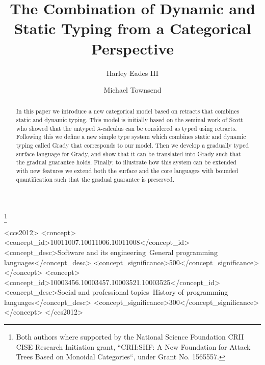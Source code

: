 \documentclass[sigplan]{acmart}\settopmatter{printfolios=true}
\begin{document}
\title{The Combination of Dynamic and Static Typing from a Categorical Perspective}
\author{Harley Eades III}

\author{Michael Townsend}

\thanks{Both authors where supported by the National Science
  Foundation CRII CISE Research Initiation grant, ``CRII:SHF: A New
  Foundation for Attack Trees Based on Monoidal Categories``, under
  Grant No. 1565557.}

\begin{CCSXML}
<ccs2012>
<concept>
<concept_id>10011007.10011006.10011008</concept_id>
<concept_desc>Software and its engineering~General programming languages</concept_desc>
<concept_significance>500</concept_significance>
</concept>
<concept>
<concept_id>10003456.10003457.10003521.10003525</concept_id>
<concept_desc>Social and professional topics~History of programming languages</concept_desc>
<concept_significance>300</concept_significance>
</concept>
</ccs2012>
\end{CCSXML}



\begin{abstract} 
  In this paper we introduce a new categorical model based on retracts
  that combines static and dynamic typing.  This model is initially
  based on the seminal work of Scott who showed that the untyped
  $\lambda$-calculus can be considered as typed using retracts.
  Following this we define a new simple type system which combines
  static and dynamic typing called Grady that corresponds to our
  model.  Then we develop a gradually typed surface language for
  Grady, and show that it can be translated into Grady such that the
  gradual guarantee holds.  Finally, to illustrate how this system can
  be extended with new features we extend both the surface and the
  core languages with bounded quantification such that the gradual
  guarantee is preserved.
\end{abstract}
\end{document}
